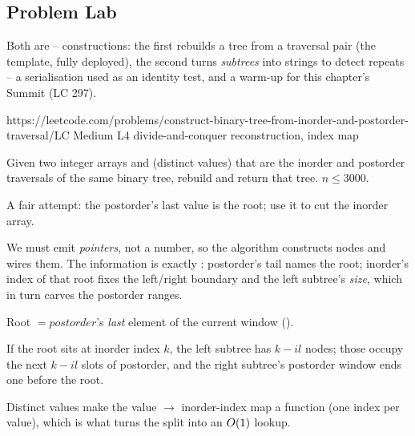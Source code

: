 \subsection{Problem Lab}

Both are -- constructions: the first rebuilds a tree from a traversal pair (the
 template, fully deployed), the second turns \emph{subtrees} into
strings to detect repeats -- a serialisation used as an identity test, and a warm-up for
this chapter's Summit (LC 297).

  {https://leetcode.com/problems/construct-binary-tree-from-inorder-and-postorder-traversal/}{LC Medium L4}
  {divide-and-conquer reconstruction, index map}

\begin{problemstatement}
Given two integer arrays  and  (distinct values) that are
the inorder and postorder traversals of the same binary tree, rebuild and return that
tree. $n \le 3000$.
\end{problemstatement}

\begin{attemptgate}
A fair attempt: the postorder's last value is the root; use it to cut the inorder array.
\end{attemptgate}

We must emit \emph{pointers}, not a number, so the algorithm constructs nodes and wires
them. The information is exactly : postorder's tail names the
root; inorder's index of that root fixes the left/right boundary and the left subtree's
\emph{size}, which in turn carves the postorder ranges.

\begin{observation}
Root $= \mathit{postorder}$'s \emph{last} element of the current window ().
\end{observation}
\begin{observation}
If the root sits at inorder index $k$, the left subtree has $k-il$ nodes; those occupy the
next $k-il$ slots of postorder, and the right subtree's postorder window ends one before
the root.
\end{observation}
\begin{observation}
Distinct values make the value $\to$ inorder-index map a function (one index per value),
which is what turns the split into an $O(1)$ lookup.
\end{observation}

